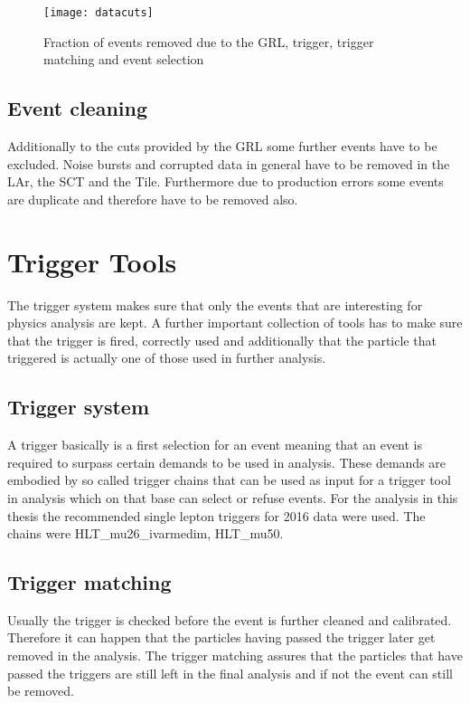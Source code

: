\begin{figure}[h]
\centering
\texttt{[image: datacuts]}
\caption{Fraction of events removed due to the GRL, trigger, trigger matching and event selection}
\label{fig:datacuts}
\end{figure}



\subsection{Event cleaning}

Additionally to the cuts provided by the GRL some further events have to be excluded. Noise bursts and corrupted data in general have to be removed in the LAr, the SCT and the Tile. Furthermore due to production errors some events are duplicate and therefore have to be removed also. 


\section{Trigger Tools}

The trigger system makes sure that only the events that are interesting for physics analysis are kept.
A further important collection of tools has to make sure that the trigger is fired, correctly used and additionally that the particle that triggered is actually one of those used in further analysis.


\subsection{Trigger system}


A trigger basically is a first selection for an event meaning that an event is required to surpass certain demands to be used in analysis. These demands are embodied by so called trigger chains that can be used as input for a trigger tool in analysis which on that base can select or refuse events. For the analysis in this thesis the recommended single lepton triggers for 2016 data were used. The chains were HLT\_mu26\_ivarmedim, HLT\_mu50.



\subsection{Trigger matching}

Usually the trigger is checked before the event is further cleaned and calibrated. Therefore it can happen that the particles having passed the trigger later get removed in the analysis. The trigger matching assures that the particles that have passed the triggers are still left in the final analysis and if not the event can still be removed.

